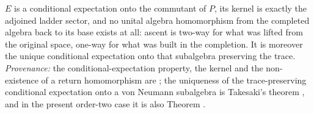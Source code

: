 $E$ is a conditional expectation onto the commutant of $P$, its kernel is exactly the adjoined ladder sector, and no unital algebra homomorphism from the completed algebra back to its base exists at all: ascent is two-way for what was lifted from the original space, one-way for what was built in the completion. It is moreover the unique conditional expectation onto that subalgebra preserving the trace. \emph{Provenance:} the conditional-expectation property, the kernel and the non-existence of a return homomorphism are \cite[Prop.~7.5, Thm.~7.6]{ButlerT1}; the uniqueness of the trace-preserving conditional expectation onto a von Neumann subalgebra is Takesaki's theorem \cite{Takesaki1972}, and in the present order-two case it is also Theorem .
